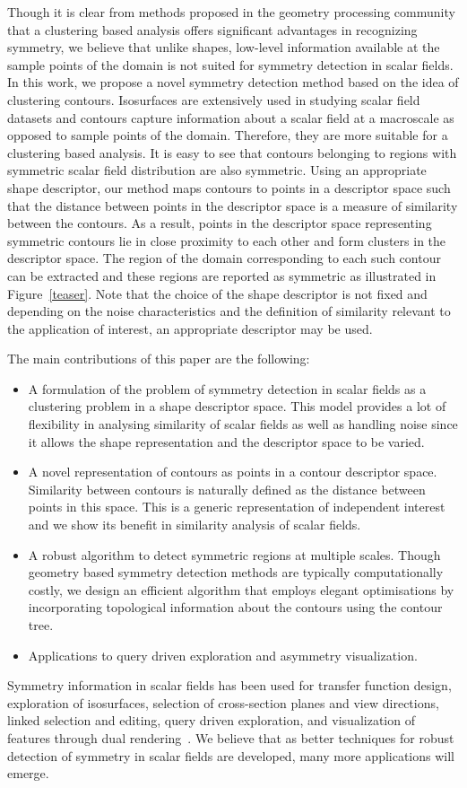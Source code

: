 \documentclass[review,journal]{vgtc}         %
\begin{document}
Though it is clear from methods proposed in the geometry processing community
that a clustering based analysis offers significant advantages in recognizing symmetry,
we believe that unlike shapes, low-level information available at the sample points of the 
domain is not suited for symmetry detection in scalar fields. In this work, we propose 
a novel symmetry detection method based on the idea of clustering contours. Isosurfaces
are extensively used in studying scalar field datasets and contours capture information 
about a scalar field at a macroscale as opposed to sample points of the domain. Therefore, they
are more suitable for a clustering based analysis. It is easy to see that contours
belonging to regions with symmetric scalar field distribution are also symmetric. Using an 
appropriate shape descriptor, our method maps contours to points in a descriptor space 
such that the distance between points in the descriptor space is a measure of similarity 
between the contours. As a result, points in the descriptor space 
representing symmetric contours lie in close 
proximity to each other and form clusters in the descriptor space. The region of the domain
corresponding to each such contour can be extracted and these regions
are reported as symmetric as illustrated in Figure~\ref{teaser}. Note that the choice
of the shape descriptor is not fixed and depending on the noise characteristics and the definition
of similarity relevant to the application of interest, an appropriate descriptor may be used.

The main contributions of this paper are the following:
\begin{itemize}
\item A formulation of the problem of symmetry detection in scalar fields
as a clustering problem in a shape descriptor space. This model
provides a lot of flexibility in analysing similarity of scalar fields
as well as handling noise since it allows the shape representation and the 
descriptor space to be varied.
\item A novel representation of contours as points in a contour descriptor space.
Similarity between contours is naturally defined as the distance between points 
in this space. This is a generic representation of independent interest 
and we show its benefit in similarity analysis of scalar fields.
\item A robust algorithm to detect symmetric regions at multiple scales. Though geometry based 
symmetry detection methods are typically computationally costly, we design an efficient algorithm 
that employs elegant optimisations by incorporating topological information 
about the contours using the contour tree.
\item Applications to query driven exploration and asymmetry visualization.
\end{itemize}
Symmetry information in scalar fields
has been used for transfer function design, exploration of isosurfaces, selection of cross-section
planes and view directions, linked selection and editing, query driven exploration,
and visualization of features through dual rendering~\cite{ThomN11,HongS08,ThomN13,MasoodTN13}.
We believe that as better techniques for robust detection of symmetry in scalar fields are developed,
many more applications will emerge.
\end{document}
